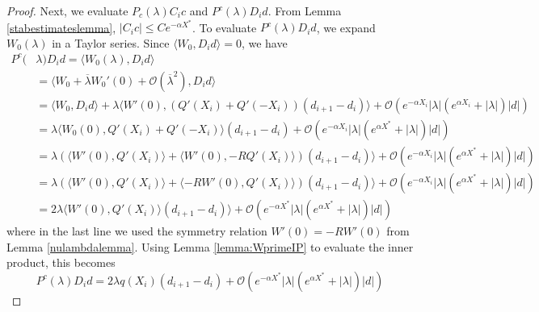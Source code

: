 \documentclass[thesis.tex]{subfiles}
\begin{document}
\begin{lemma}
\begin{proof}
Next, we evaluate $P_c(\lambda) C_i c$ and $P^c(\lambda)D_i d$. From Lemma \ref{stabestimateslemma}, $|C_i c| \leq C e^{-\alpha X^*}$. To evaluate $P^c(\lambda)D_i d$, we expand $W_0(\lambda)$ in a Taylor series. Since $\langle W_0, D_i d \rangle = 0$, we have 
\begin{align*}
P^c(&\lambda)D_i d = \langle W_0(\lambda), D_i d \rangle \\
&= \langle W_0 + \overline{\lambda} W_0'(0) + \mathcal{O}(\overline{\lambda}^2), D_i d \rangle \\
&= \langle W_0, D_i d \rangle + \lambda \langle W'(0), (Q'(X_i) + Q'(-X_i))(d_{i+1} - d_i ) \rangle + \mathcal{O}(e^{-\alpha X_i} |\lambda|(e^{\alpha X_i} + |\lambda|)|d|) \\
&= \lambda \langle W_0(0), Q'(X_i) + Q'(-X_i) \rangle (d_{i+1} - d_i ) + \mathcal{O}(e^{-\alpha X_i} |\lambda|(e^{\alpha X^*} + |\lambda|)|d|) \\
&= \lambda ( \langle W'(0), Q'(X_i) \rangle + \langle W'(0), -R Q'(X_i)\rangle )(d_{i+1} - d_i ) \rangle + \mathcal{O}(e^{-\alpha X_i} |\lambda|(e^{\alpha X^*} + |\lambda|)|d|)\\
&= \lambda \left( \langle W'(0), Q'(X_i) \rangle + \langle -R W'(0), Q'(X_i)\rangle \right)(d_{i+1} - d_i ) \rangle + \mathcal{O}(e^{-\alpha X_i} |\lambda|(e^{\alpha X^*} + |\lambda|)|d|) \\
&= 2 \lambda \langle W'(0), Q'(X_i) \rangle (d_{i+1} - d_i ) \rangle + \mathcal{O}(e^{-\alpha X^*} |\lambda|(e^{\alpha X^*} + |\lambda|)|d|)
\end{align*}
where in the last line we used the symmetry relation $W'(0) = -R W'(0)$ from Lemma \ref{nulambdalemma}. Using Lemma \ref{lemma:WprimeIP} to evaluate the inner product, this becomes
\begin{equation}\label{PcDid2}
P^c(\lambda)D_i d = 2 \lambda q(X_i) (d_{i+1} - d_i ) + \mathcal{O}(e^{-\alpha X^*} |\lambda|(e^{\alpha X^*} + |\lambda|)|d|)
\end{equation}


\end{proof}
\end{lemma}
\end{document}
